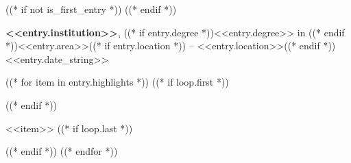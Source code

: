 ((* if not is_first_entry *))
\vspace{8pt}
((* endif *))

\textbf{<<entry.institution>>}, ((* if entry.degree *))<<entry.degree>> in ((* endif *))<<entry.area>>((* if entry.location *)) -- <<entry.location>>((* endif *)) \hfill <<entry.date_string>>

((* for item in entry.highlights *))
    ((* if loop.first *))
\begin{highlights}
    ((* endif *))
\item <<item>>
    ((* if loop.last *))
\end{highlights}
    ((* endif *))
((* endfor *))